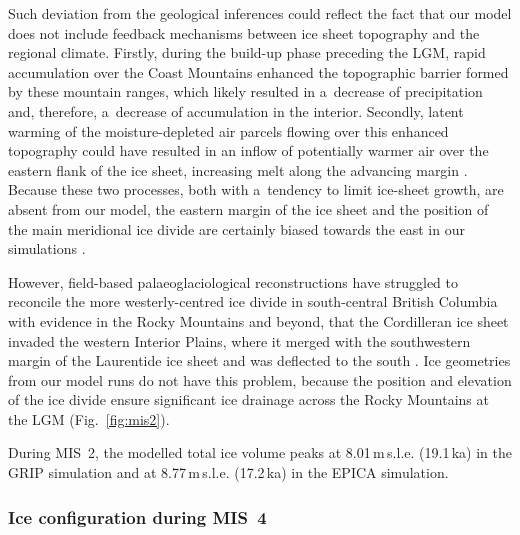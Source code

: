 \documentclass[tc, manuscript]{copernicus}
\begin{document}
      Such deviation from the geological inferences could reflect the fact
      that our model does not include feedback mechanisms between ice sheet
      topography and the regional climate. Firstly, during the build-up
      phase preceding the LGM, rapid accumulation over the Coast Mountains
      enhanced the topographic barrier formed by these mountain ranges,
      which likely resulted in a~decrease of precipitation and, therefore,
      a~decrease of accumulation in the interior. Secondly, latent warming of
      the moisture-depleted air parcels flowing over this enhanced
      topography could have resulted in an inflow of potentially warmer air
      over the eastern flank of the ice sheet, increasing melt along the
      advancing margin \citep[cf.][]{Langen.etal.2012}. Because these two
      processes, both with a~tendency to limit ice-sheet growth, are absent
      from our model, the eastern margin of the ice sheet and the position
      of the main meridional ice divide are certainly biased towards the
      east in our simulations \citep{Seguinot.etal.2014}.

      However, field-based palaeoglaciological reconstructions have
      struggled to reconcile the more westerly-centred ice divide in
      south-central British Columbia with evidence in the Rocky Mountains
      and beyond, that the Cordilleran ice sheet invaded the western
      Interior Plains, where it merged with the southwestern margin of the
      Laurentide ice sheet and was deflected to the south
      \citep{Jackson.etal.1997, Bednarski.Smith.2007, Kleman.etal.2010,
      Margold.etal.2013, Margold.etal.2013a}. Ice geometries from our model
      runs do not have this problem, because the position and elevation of
      the ice divide ensure significant ice drainage across the Rocky
      Mountains at the LGM (Fig.~\ref{fig:mis2}).

      During MIS~2, the modelled total ice volume peaks at
      8.01\,\unit{m}\,s.l.e. (19.1\,\unit{ka}) in the GRIP simulation and at
      8.77\,\unit{m}\,s.l.e. (17.2\,\unit{ka}) in the EPICA simulation.

\subsubsection{Ice configuration during MIS~4}
\label{sec:mis4}
\end{document}
